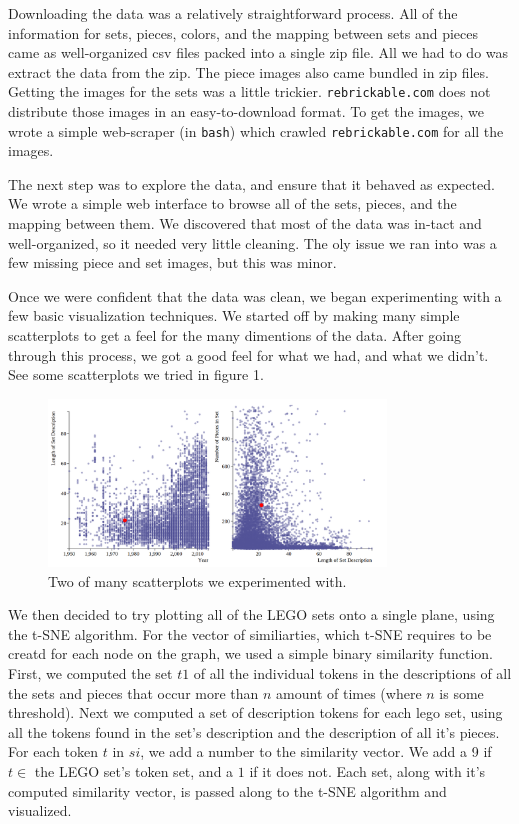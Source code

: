 \documentclass[a4paper, 11pt]{article}
\begin{document}
Downloading the data was a relatively straightforward process. All of the information for sets, pieces, colors, and the mapping between sets and pieces came as well-organized csv files packed into a single zip file. All we had to do was extract the data from the zip. The piece images also came bundled in zip files. Getting the images for the sets was a little trickier. \texttt{rebrickable.com} does not distribute those images in an easy-to-download format. To get the images, we wrote a simple web-scraper (in \texttt{bash}) which crawled \texttt{rebrickable.com} for all the images.

The next step was to explore the data, and ensure that it behaved as expected. We wrote a simple web interface to browse all of the sets, pieces, and the mapping between them. We discovered that most of the data was in-tact and well-organized, so it needed very little cleaning. The oly issue we ran into was a few missing piece and set images, but this was minor.

Once we were confident that the data was clean, we began experimenting with a few basic visualization techniques. We started off by making many simple scatterplots to get a feel for the many dimentions of the data. After going through this process, we got a good feel for what we had, and what we didn't. See some scatterplots we tried in figure 1.

\begin{figure}[h!]
\centering
\includegraphics[width=0.8\textwidth]{img/scatterplots.png}
\caption{Two of many scatterplots we experimented with.}

\end{figure}

We then decided to try plotting all of the LEGO sets onto a single plane, using the t-SNE algorithm. For the vector of similiarties, which t-SNE requires to be creatd for each node on the graph, we used a simple binary similarity function. First, we computed the set $t1$ of all the individual tokens in the descriptions of all the sets and pieces that occur more than $n$ amount of times (where $n$ is some threshold). Next we computed a set of description tokens for each lego set, using all the tokens found in the set's description and the description of all it's pieces. For each token $t$ in $si$, we add a number to the similarity vector. We add a 9 if $t \in$ the LEGO set's token set, and a $1$ if it does not. Each set, along with it's computed similarity vector, is passed along to the t-SNE algorithm and visualized.
\end{document}
